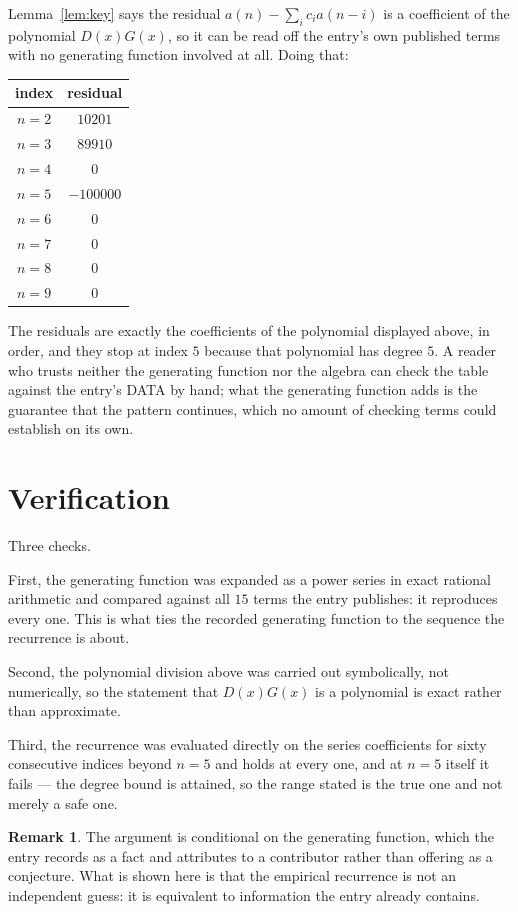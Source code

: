 \documentclass[11pt,a4paper]{article}
\theoremstyle{plain}
\theoremstyle{definition}
\newtheorem{remark}[theorem]{Remark}
\begin{document}
Lemma~\ref{lem:key} says the residual $a(n)-\sum_ic_ia(n-i)$ is a coefficient of the
polynomial $D(x)G(x)$, so it can be read off the entry's own published terms with no
generating function involved at all. Doing that:
\begin{center}
\begin{tabular}{cc}
index & residual \\ \hline
$n=2$ & $10201$ \\
$n=3$ & $89910$ \\
$n=4$ & $0$ \\
$n=5$ & $-100000$ \\
$n=6$ & $0$ \\
$n=7$ & $0$ \\
$n=8$ & $0$ \\
$n=9$ & $0$
\end{tabular}
\end{center}
The residuals are exactly the coefficients of the polynomial displayed above, in order, and
they stop at index $5$ because that polynomial has degree $5$. A reader who trusts
neither the generating function nor the algebra can check the table against the entry's DATA
by hand; what the generating function adds is the guarantee that the pattern continues, which
no amount of checking terms could establish on its own.

\section{Verification}

Three checks.

First, the generating function was expanded as a power series in exact rational arithmetic and
compared against all $15$ terms the entry publishes: it reproduces every one. This is
what ties the recorded generating function to the sequence the recurrence is about.

Second, the polynomial division above was carried out symbolically, not numerically, so the
statement that $D(x)G(x)$ is a polynomial is exact rather than approximate.

Third, the recurrence was evaluated directly on the series coefficients for sixty consecutive
indices beyond $n=5$ and holds at every one, and at $n=5$ itself it fails --- the
degree bound is attained, so the range stated is the true one and not merely a safe one.

\begin{remark}
The argument is conditional on the generating function, which the entry records as a fact and
attributes to a contributor rather than offering as a conjecture. What is shown here is that
the empirical recurrence is not an independent guess: it is equivalent to information the
entry already contains.
\end{remark}
\end{document}
